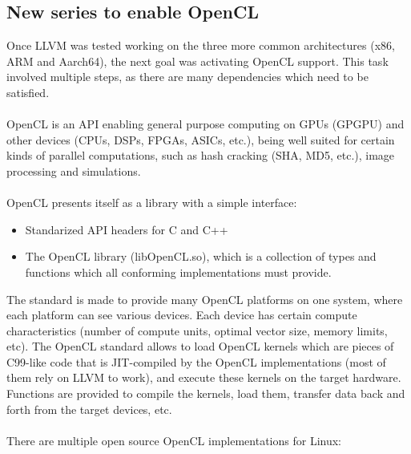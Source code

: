 \documentclass[12pt,a4paper,oneside]{article}
\begin{document}
\subsection*{New series to enable OpenCL}
Once LLVM was tested working on the three more common architectures (x86, ARM and
Aarch64), the next goal was activating OpenCL support. This task involved
multiple steps, as there are many dependencies which need to be satisfied.\\\\
OpenCL is an API enabling general purpose computing on GPUs (GPGPU) and other
devices (CPUs, DSPs, FPGAs, ASICs, etc.), being well suited for certain kinds of
parallel computations, such as hash cracking (SHA, MD5, etc.), image processing and
simulations.\\\\
OpenCL presents itself as a library with a simple interface:
\begin{itemize}
  \item Standarized API headers for C and C++
  \item The OpenCL library (libOpenCL.so), which is a collection of types and
  functions which all conforming implementations must provide.
\end{itemize}
The standard is made to provide many OpenCL platforms on one system, where each
platform can see various devices. Each device has certain compute characteristics
(number of compute units, optimal vector size, memory limits, etc). The OpenCL
standard allows to load OpenCL kernels which are pieces of C99-like code that is
JIT-compiled by the OpenCL implementations (most of them rely on LLVM to work),
and execute these kernels on the target hardware. Functions are provided to
compile the kernels, load them, transfer data back and forth from the target
devices, etc.\\\\
There are multiple open source OpenCL implementations for Linux:
\end{document}

